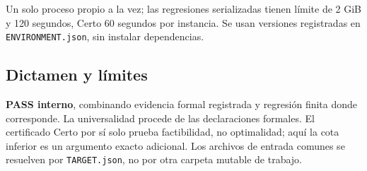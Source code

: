 Un solo proceso propio a la vez; las regresiones serializadas tienen
límite de 2 GiB y 120 segundos, Certo 60 segundos por instancia. Se usan
versiones registradas en \texttt{ENVIRONMENT.json}, sin instalar
dependencias.

\subsection{Dictamen y límites}\label{dictamen-y-luxedmites}

\textbf{PASS interno}, combinando evidencia formal registrada y
regresión finita donde corresponde. La universalidad procede de las
declaraciones formales. El certificado Certo por sí solo prueba
factibilidad, no optimalidad; aquí la cota inferior es un argumento
exacto adicional. Los archivos de entrada comunes se resuelven por
\texttt{TARGET.json}, no por otra carpeta mutable de trabajo.
